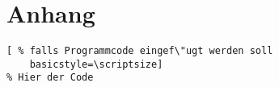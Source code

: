 \chapter{Anhang}
\label{cha:anhang}
\begin{lstlisting}[ % falls Programmcode eingef\"ugt werden soll
	basicstyle=\scriptsize]
% Hier der Code
\end{lstlisting}
